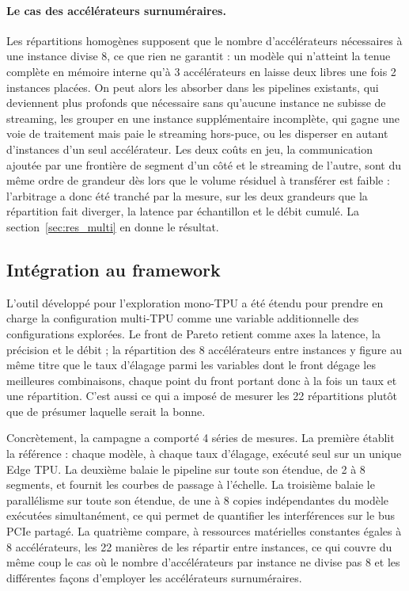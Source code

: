 \documentclass[11pt,a4paper]{report}
\begin{document}
\paragraph{Le cas des accélérateurs surnuméraires.} Les répartitions homogènes supposent que le nombre d'accélérateurs nécessaires à une instance divise 8, ce que rien ne garantit : un modèle qui n'atteint la tenue complète en mémoire interne qu'à 3 accélérateurs en laisse deux libres une fois 2 instances placées. On peut alors les absorber dans les pipelines existants, qui deviennent plus profonds que nécessaire sans qu'aucune instance ne subisse de streaming, les grouper en une instance supplémentaire incomplète, qui gagne une voie de traitement mais paie le streaming hors-puce, ou les disperser en autant d'instances d'un seul accélérateur. Les deux coûts en jeu, la communication ajoutée par une frontière de segment d'un côté et le streaming de l'autre, sont du même ordre de grandeur dès lors que le volume résiduel à transférer est faible : l'arbitrage a donc été tranché par la mesure, sur les deux grandeurs que la répartition fait diverger, la latence par échantillon et le débit cumulé. La section~\ref{sec:res_multi} en donne le résultat.

\subsection{Intégration au framework}

L'outil développé pour l'exploration mono-TPU a été étendu pour prendre en charge la configuration multi-TPU comme une variable additionnelle des configurations explorées. Le front de Pareto retient comme axes la latence, la précision et le débit ; la répartition des 8 accélérateurs entre instances y figure au même titre que le taux d'élagage parmi les variables dont le front dégage les meilleures combinaisons, chaque point du front portant donc à la fois un taux et une répartition. C'est aussi ce qui a imposé de mesurer les 22 répartitions plutôt que de présumer laquelle serait la bonne.

Concrètement, la campagne a comporté 4 séries de mesures. La première établit la référence : chaque modèle, à chaque taux d'élagage, exécuté seul sur un unique Edge TPU. La deuxième balaie le pipeline sur toute son étendue, de 2 à 8 segments, et fournit les courbes de passage à l'échelle. La troisième balaie le parallélisme sur toute son étendue, de une à 8 copies indépendantes du modèle exécutées simultanément, ce qui permet de quantifier les interférences sur le bus PCIe partagé. La quatrième compare, à ressources matérielles constantes égales à 8 accélérateurs, les 22 manières de les répartir entre instances, ce qui couvre du même coup le cas où le nombre d'accélérateurs par instance ne divise pas 8 et les différentes façons d'employer les accélérateurs surnuméraires.
\end{document}
